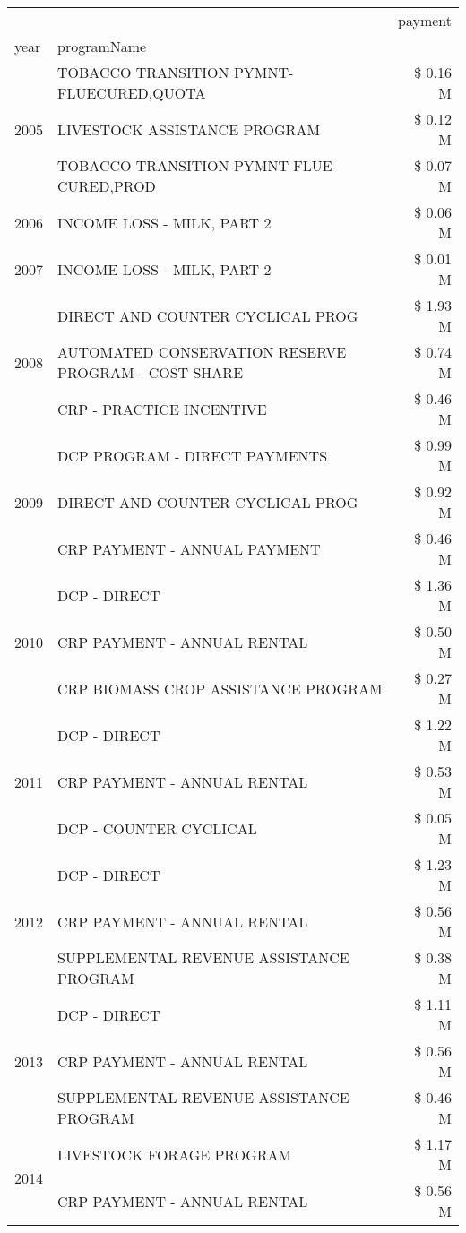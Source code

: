 \begin{tabular}{llr}
\toprule
 &  & payment \\
year & programName &  \\
\midrule
\multirow[t]{3}{*}{2005} & TOBACCO TRANSITION PYMNT-FLUECURED,QUOTA & \$ 0.16 M \\
 & LIVESTOCK ASSISTANCE PROGRAM & \$ 0.12 M \\
 & TOBACCO TRANSITION PYMNT-FLUE CURED,PROD & \$ 0.07 M \\
\cline{1-3}
2006 & INCOME LOSS - MILK, PART 2 & \$ 0.06 M \\
\cline{1-3}
2007 & INCOME LOSS - MILK, PART 2 & \$ 0.01 M \\
\cline{1-3}
\multirow[t]{3}{*}{2008} & DIRECT AND COUNTER CYCLICAL PROG & \$ 1.93 M \\
 & AUTOMATED CONSERVATION RESERVE PROGRAM - COST SHARE & \$ 0.74 M \\
 & CRP - PRACTICE INCENTIVE & \$ 0.46 M \\
\cline{1-3}
\multirow[t]{3}{*}{2009} & DCP PROGRAM - DIRECT PAYMENTS & \$ 0.99 M \\
 & DIRECT AND COUNTER CYCLICAL PROG & \$ 0.92 M \\
 & CRP PAYMENT - ANNUAL PAYMENT & \$ 0.46 M \\
\cline{1-3}
\multirow[t]{3}{*}{2010} & DCP - DIRECT & \$ 1.36 M \\
 & CRP PAYMENT - ANNUAL RENTAL & \$ 0.50 M \\
 & CRP BIOMASS CROP ASSISTANCE PROGRAM & \$ 0.27 M \\
\cline{1-3}
\multirow[t]{3}{*}{2011} & DCP - DIRECT & \$ 1.22 M \\
 & CRP PAYMENT - ANNUAL RENTAL & \$ 0.53 M \\
 & DCP - COUNTER CYCLICAL & \$ 0.05 M \\
\cline{1-3}
\multirow[t]{3}{*}{2012} & DCP - DIRECT & \$ 1.23 M \\
 & CRP PAYMENT - ANNUAL RENTAL & \$ 0.56 M \\
 & SUPPLEMENTAL REVENUE ASSISTANCE PROGRAM & \$ 0.38 M \\
\cline{1-3}
\multirow[t]{3}{*}{2013} & DCP - DIRECT & \$ 1.11 M \\
 & CRP PAYMENT - ANNUAL RENTAL & \$ 0.56 M \\
 & SUPPLEMENTAL REVENUE ASSISTANCE PROGRAM & \$ 0.46 M \\
\cline{1-3}
\multirow[t]{3}{*}{2014} & LIVESTOCK FORAGE PROGRAM & \$ 1.17 M \\
 & CRP PAYMENT - ANNUAL RENTAL & \$ 0.56 M \\

\end{tabular}
